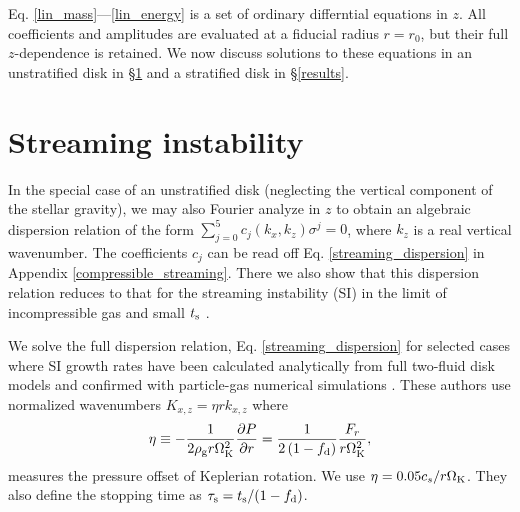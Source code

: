 
Eq. \ref{lin_mass}---\ref{lin_energy} is a set of ordinary
differntial equations in $z$. All coefficients and amplitudes are
evaluated at a fiducial radius $r=r_0$, but their full $z$-dependence
is retained. We now discuss solutions to these equations in an unstratified disk 
in \S\ref{si} and a stratified disk in \S\ref{results}.  
 

\section{Streaming instability}\label{si}
In the special case of an unstratified disk (neglecting the vertical
component of the stellar gravity), we may also Fourier analyze in $z$
to obtain an algebraic dispersion relation of the form  
$\sum_{j=0}^{5}c_j(k_x,k_z)\sigma^j = 0$, where $k_z$ is a real
vertical wavenumber. The coefficients $c_j$ can be read 
off Eq. \ref{streaming_dispersion} in  Appendix \ref{compressible_streaming}. 
There we also show that this dispersion relation reduces to that for
the streaming instability (SI) in the limit of incompressible gas and small
$t_\mathrm{s}$ \citep{youdin05a,jacquet11}.   
 


We solve the full dispersion relation, Eq. \ref{streaming_dispersion} for selected cases where SI  
growth rates have been 
calculated analytically from full two-fluid disk models and confirmed
with particle-gas numerical simulations 
\citep[namely][]{youdin07b,bai10b}. These authors use normalized
wavenumbers $K_{x,z} = \eta r k_{x,z}$ where
\begin{align} 
  \eta \equiv -\frac{1}{2\rho_\mathrm{g} r\Omega_{\rm K}^2}\frac{\partial P}{\partial r} = 
  \frac{1}{2\left(1-f_\mathrm{d}\right)}\frac{F_r}{r\Omega_{\rm K}^2}, 
\end{align} 
measures the pressure offset of Keplerian rotation. We use
$\eta=0.05c_s/r\Omega_{\rm K}$. They also define the stopping time as
$\tau_\mathrm{s}=t_\mathrm{s}/(1-f_\mathrm{d})$.  

